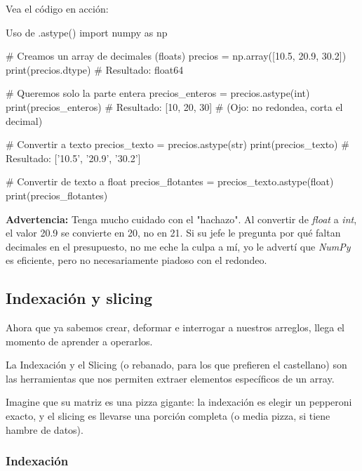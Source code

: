 Vea el código en acción:

\begin{pycode}{Uso de .astype()}
import numpy as np

# Creamos un array de decimales (floats)
precios = np.array([10.5, 20.9, 30.2])
print(precios.dtype) # Resultado: float64

# Queremos solo la parte entera
precios_enteros = precios.astype(int)
print(precios_enteros) # Resultado: [10, 20, 30]
# (Ojo: no redondea, corta el decimal)

# Convertir a texto
precios_texto = precios.astype(str) 
print(precios_texto) # Resultado: ['10.5', '20.9', '30.2']

# Convertir de texto a float
precios_flotantes = precios_texto.astype(float)
print(precios_flotantes)

\end{pycode}

\begin{nota}
    \textbf{Advertencia:} Tenga mucho cuidado con el "hachazo". Al convertir de \textit{float} a \textit{int}, el valor 20.9 se convierte en 20, no en 21. Si su jefe le pregunta por qué faltan decimales en el presupuesto, no me eche la culpa a mí, yo le advertí que \textit{NumPy} es eficiente, pero no necesariamente piadoso con el redondeo.
\end{nota}




\subsection{Indexación y slicing}

Ahora que ya sabemos crear, deformar e interrogar a nuestros arreglos, llega el momento de aprender a operarlos.

La Indexación y el Slicing (o rebanado, para los que prefieren el castellano) son las herramientas que nos permiten extraer elementos específicos de un array. 

\begin{ejemplo}
Imagine que su matriz es una pizza gigante: la indexación es elegir un pepperoni exacto, y el slicing es llevarse una porción completa (o media pizza, si tiene hambre de datos).
\end{ejemplo}

\subsubsection{Indexación}

